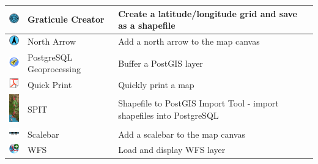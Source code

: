 \begin{minipage}{\textwidth}
\begin{table}[H]
\begin{tabular}{|l|l|p{4in}|}
\hline
\includegraphics[width=0.7cm]{plugins_graticule_creator_images/grid_maker}
 & Graticule Creator \index{plugins!graticule}& Create a latitude/longitude grid and save as a shapefile\\
\hline
\includegraphics[width=0.7cm]{plugins_decorations_images/north_arrow}
& North Arrow \index{plugins!north arrow}& Add a north arrow to the map canvas\\
\hline
\includegraphics[width=0.7cm]{plugins_geoprocessing_images/icon_buffer}
 & PostgreSQL Geoprocessing \index{plugins!geoprocessing}& Buffer a PostGIS layer \\
\hline
\includegraphics[width=0.7cm]{plugins_quick_print_images/quick_print}
 & Quick Print \index{plugins!quickprint}& Quickly print a map \\
\hline
\includegraphics[width=0.7cm]{plugins_spit_images/spit}
 & SPIT \index{plugins!spit}& Shapefile to PostGIS Import Tool - import shapefiles into PostgreSQL\\
\hline
\includegraphics[width=0.7cm]{plugins_decorations_images/scale_bar}
 & Scalebar \index{plugins!scalebar}& Add a scalebar to the map canvas\\
\hline 
\includegraphics[width=0.7cm]{plugins_add_wfs_layer_images/mIconAddWfsLayer}
 & WFS & Load and display WFS layer \\
\hline
\end{tabular}
\end{table}
\end{minipage}

